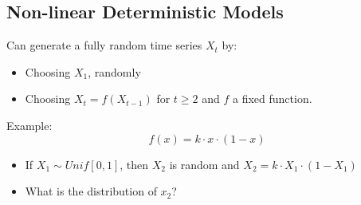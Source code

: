 \subsection{Non-linear Deterministic Models}
Can generate a fully random time series $X_t$ by: 
\begin{itemize}
    \item Choosing $X_1$, randomly
    \item Choosing $X_t=f(X_{t-1})$ for $t\geq 2$ and $f$ a fixed function.
\end{itemize}

Example:
\[
f(x)=k\cdot x\cdot (1-x)
\]
\begin{itemize}
    \item If $X_1 \sim Unif[0,1]$, then $X_2$ is random and $X_2=k\cdot X_1 \cdot (1-X_1)$
    \item What is the distribution of $x_2$?
\end{itemize}